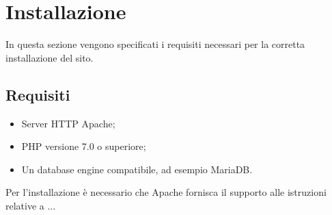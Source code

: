 \section{Installazione}
In questa sezione vengono specificati i requisiti necessari per la corretta installazione del sito.
\subsection{Requisiti}
\begin{itemize}
\item Server HTTP Apache;
\item PHP versione 7.0 o superiore;
\item Un database engine compatibile, ad esempio MariaDB.
\end{itemize}
Per l'installazione è necessario che Apache fornisca il supporto alle istruzioni relative a ...